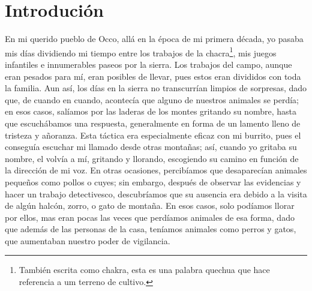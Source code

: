 \cleardoublepage
\newpage
{}
\chapter*{Introdución} %

En mi querido pueblo de Occo, allá en la época de mi primera década, yo pasaba mis días dividiendo mi tiempo entre los trabajos de la chacra\footnote{También escrita como chakra, esta es una palabra quechua que hace referencia a um terreno de cultivo.}, mis juegos infantiles e innumerables paseos por la sierra.
Los trabajos del campo, aunque eran pesados para mí, eran posibles de llevar, pues estos eran divididos con toda la familia. 
Aun así, los días en la sierra no transcurrían limpios de sorpresas, dado que, de cuando en cuando, acontecía que alguno de nuestros animales se perdía; en esos casos, salíamos por las laderas de los montes gritando su nombre, hasta que escuchábamos una respuesta, generalmente en forma de un lamento lleno de tristeza y añoranza.
Esta táctica era especialmente eficaz con mi burrito, pues el conseguía escuchar mi llamado desde otras montañas; así, cuando yo gritaba su nombre, el volvía a mí, gritando y llorando, escogiendo su camino en función de la dirección de mi voz.  
En otras ocasiones, percibíamos que desaparecían animales pequeños como pollos o cuyes; sin embargo, después de observar las evidencias y hacer un trabajo detectivesco, descubríamos que su ausencia era debido a la visita de algún halcón, zorro, o gato de montaña.
En esos casos, solo podíamos llorar por ellos, mas eran pocas las veces que perdíamos animales de esa forma, dado que además de las personas de la casa, teníamos animales como perros y gatos, que aumentaban nuestro poder de vigilancia.

